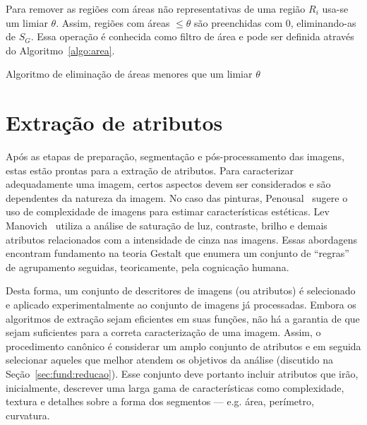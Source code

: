Para remover as regiões com áreas não representativas de uma região $R_i$ usa-se
um limiar $\theta$. Assim, regiões com áreas $\leq \theta$ são preenchidas com
$0$, eliminando-as de $S_G$. Essa operação é conhecida como filtro de área e
pode ser definida através do Algoritmo~\ref{algo:area}.

\begin{espacosimples}
\begin{algorithm2e}[H]
  \caption{Algoritmo de eliminação de áreas menores que um limiar $\theta$}
  \label{algo:area}
  \SetAlgoLined

\end{algorithm2e}
\end{espacosimples}
             
\section{Extração de atributos}
\label{sec:atributos}

Após as etapas de preparação, segmentação e pós-processamento das imagens, estas
estão prontas para a extração de atributos. Para caracterizar adequadamente uma
imagem, certos aspectos devem ser considerados e são dependentes da natureza da
imagem. No caso das pinturas, Penousal~\cite{penousal} sugere o uso de
complexidade de imagens para estimar características estéticas. Lev
Manovich~\cite{manovich} utiliza a análise de saturação de luz, contraste, brilho
e demais atributos relacionados com a intensidade de cinza nas imagens.  Essas
abordagens encontram fundamento na teoria Gestalt que enumera um conjunto de
``regras'' de agrupamento seguidas, teoricamente, pela cognicação humana.~\cite{haralick}



Desta forma, um conjunto de descritores de imagens (ou atributos) é selecionado
e aplicado experimentalmente ao conjunto de imagens já processadas. Embora os
algoritmos de extração sejam eficientes em suas funções, não há a garantia de
que sejam suficientes para a correta caracterização de uma imagem. Assim, o
procedimento canônico é considerar um amplo conjunto de atributos e em seguida
selecionar aqueles que melhor atendem os objetivos da análise
(discutido na Seção~\ref{sec:fund:reducao}). Esse conjunto deve portanto incluir atributos que irão,
inicialmente, descrever uma larga gama de características como complexidade,
textura e detalhes sobre a forma dos segmentos --- e.g. área, perímetro,
curvatura.

